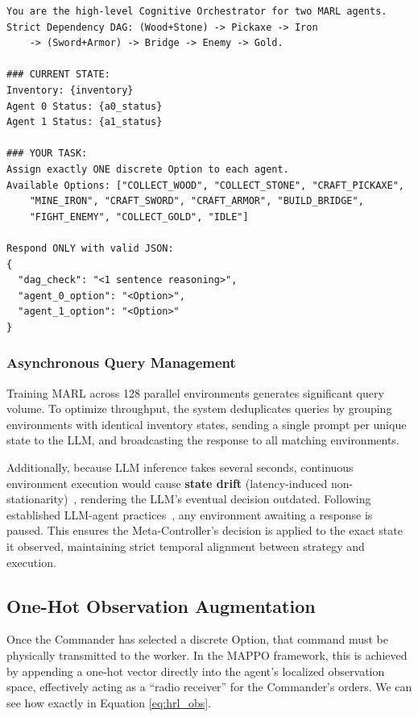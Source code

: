 \begin{hegquote}
\begin{verbatim}
You are the high-level Cognitive Orchestrator for two MARL agents.
Strict Dependency DAG: (Wood+Stone) -> Pickaxe -> Iron
    -> (Sword+Armor) -> Bridge -> Enemy -> Gold.

### CURRENT STATE:
Inventory: {inventory}
Agent 0 Status: {a0_status}
Agent 1 Status: {a1_status}

### YOUR TASK:
Assign exactly ONE discrete Option to each agent.
Available Options: ["COLLECT_WOOD", "COLLECT_STONE", "CRAFT_PICKAXE",
    "MINE_IRON", "CRAFT_SWORD", "CRAFT_ARMOR", "BUILD_BRIDGE",
    "FIGHT_ENEMY", "COLLECT_GOLD", "IDLE"]

Respond ONLY with valid JSON:
{
  "dag_check": "<1 sentence reasoning>",
  "agent_0_option": "<Option>",
  "agent_1_option": "<Option>"
}
\end{verbatim}
\end{hegquote}

\subsubsection{Asynchronous Query Management}

Training MARL across 128 parallel environments generates significant query volume. To optimize throughput, the system deduplicates queries by grouping environments with identical inventory states, sending a single prompt per unique state to the LLM, and broadcasting the response to all matching environments.

Additionally, because LLM inference takes several seconds, continuous environment execution would cause \textbf{state drift} (latency-induced non-stationarity)~\parencite{Katsikopoulos_Engelbrecht_2003}, rendering the LLM's eventual decision outdated. Following established LLM-agent practices~\parencite{Zhu_etal_2023}, any environment awaiting a response is paused. This ensures the Meta-Controller's decision is applied to the exact state it observed, maintaining strict temporal alignment between strategy and execution.

\subsection{One-Hot Observation Augmentation}
\label{sec:onehot_aug}

Once the Commander has selected a discrete Option, that command must be physically transmitted to the worker. In the MAPPO framework, this is achieved by appending a one-hot vector directly into the agent's localized observation space, effectively acting as a ``radio receiver'' for the Commander's orders. We can see how exactly in Equation \ref{eq:hrl_obs}.

